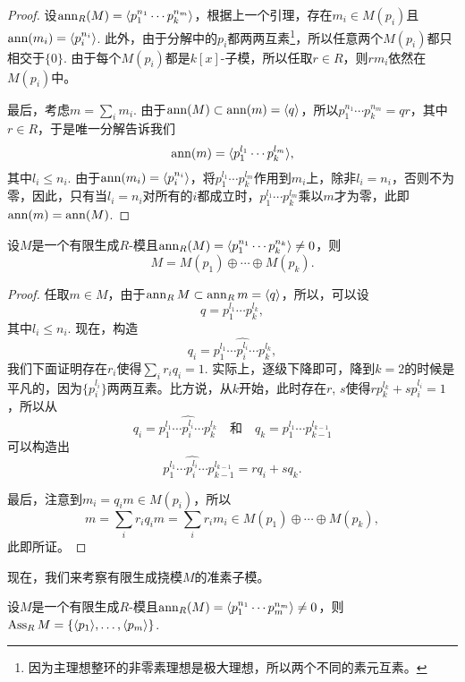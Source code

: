 \begin{proof}
    设$\operatorname{ann}_R(M)=\langle p_1^{n_1}\cdots p_k^{n_m}\rangle$，根据上一个引理，存在$m_i\in M(p_i)$且$\operatorname{ann}(m_i)=\langle p_i^{n_i}\rangle$. 此外，由于分解中的$p_i$都两两互素\footnote{因为主理想整环的非零素理想是极大理想，所以两个不同的素元互素。}，所以任意两个$M(p_i)$都只相交于$\{0\}$. 由于每个$M(p_i)$都是$k[x]$-子模，所以任取$r\in R$，则$rm_i$依然在$M(p_i)$中。

    最后，考虑$m=\sum_i m_i$. 由于$\operatorname{ann}(M)\subset \operatorname{ann}(m)=\langle q\rangle$，所以$p_1^{n_1}\cdots p_k^{n_m}=qr$，其中$r\in R$，于是唯一分解告诉我们
    \[
        \operatorname{ann}(m)=\langle p_1^{l_1}\cdots p_k^{l_m}\rangle,
    \]
    其中$l_i\leq n_i$. 由于$\operatorname{ann}(m_i)=\langle p_i^{n_i}\rangle$，将$p_1^{l_1}\cdots p_k^{l_m}$作用到$m_i$上，除非$l_i=n_i$，否则不为零，因此，只有当$l_i=n_i$对所有的$i$都成立时，$p_1^{l_1}\cdots p_k^{l_m}$乘以$m$才为零，此即$\operatorname{ann}(m)=\operatorname{ann}(M)$.
\end{proof}

\begin{pro}
    设$M$是一个有限生成$R$-模且$\operatorname{ann}_R(M)=\langle p_1^{n_1}\cdots p_k^{n_k}\rangle \neq 0$，则
    \[
        M=M(p_1)\oplus \cdots  \oplus M(p_k).
    \]
\end{pro}

\begin{proof}
    任取$m\in M$，由于$\operatorname{ann}_RM\subset \operatorname{ann}_R m=\langle q\rangle$，所以，可以设
    \[
        q=p_1^{l_1}\cdots p_k^{l_k},
    \]
    其中$l_i\leq n_i$. 现在，构造
    \[
    	q_i=p_1^{l_1}\cdots \widehat{p_i^{l_i}}\cdots p_k^{l_k},
    \]
    我们下面证明存在$r_i$使得$\sum_i r_iq_i=1$. 实际上，逐级下降即可，降到$k=2$的时候是平凡的，因为$\{p_i^{l_i}\}$两两互素。比方说，从$k$开始，此时存在$r$, $s$使得$rp_{k}^{l_{k}}+sp_i^{l_i}=1$，所以从
    \[
    q_i=p_1^{l_1}\cdots \widehat{p_i^{l_i}}\cdots p_k^{l_k} \quad\text{和}\quad q_{k}=p_1^{l_1}\cdots p_{k-1}^{l_{k-1}}
    \]
    可以构造出
    \[
    p_1^{l_1}\cdots \widehat{p_i^{l_i}}\cdots p_{k-1}^{l_{k-1}}=rq_i+sq_{k}.
    \]

    最后，注意到$m_i=q_im\in M(p_i)$，所以
    \[
    m=\sum_i r_iq_im=\sum_i r_im_i\in M(p_1)\oplus \cdots  \oplus M(p_k),
    \]
    此即所证。
\end{proof}

现在，我们来考察有限生成挠模$M$的准素子模。

\begin{pro}
    设$M$是一个有限生成$R$-模且$\operatorname{ann}_R(M)=\langle p_1^{n_1}\cdots p_m^{n_m}\rangle \neq 0$，则$\operatorname{Ass}_RM=\{\langle p_1\rangle ,\dots,\langle p_m\rangle \}$.
\end{pro}


